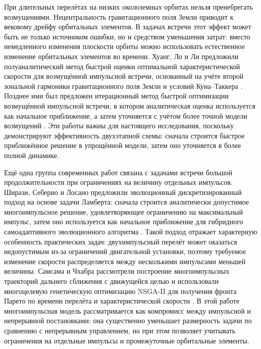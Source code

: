 При длительных перелётах на низких околоземных орбитах нельзя пренебрегать возмущениями. Нецентральность гравитационного поля Земли приводит к вековому дрейфу орбитальных элементов. В задачах встречи этот эффект может быть не только источником ошибки, но и средством уменьшения затрат: вместо немедленного изменения плоскости орбиты можно использовать естественное изменение орбитальных элементов во времени. Хуанг, Ло и Ли предложили полуаналитический метод быстрой оценки оптимальной характеристической скорости для возмущённой импульсной встречи, основанный на учёте второй зональной гармоники гравитационного поля Земли и условий Куна--Таккера \cite{huang2020fast}. Позднее ими был предложен итерационный метод быстрой оптимизации возмущённой импульсной встречи, в котором аналитическая оценка используется как начальное приближение, а затем уточняется с учётом более точной модели возмущений \cite{huang2021fast}. Эти работы важны для настоящего исследования, поскольку демонстрируют эффективность двухэтапной схемы: сначала строится быстрое приближённое решение в упрощённой модели, затем оно уточняется в более полной динамике.

Ещё одна группа современных работ связана с задачами встречи большой продолжительности при ограничениях на величину отдельных импульсов. Ширази, Себерио и Лосано предложили эволюционный дискретизированный подход на основе задачи Ламберта: сначала строится аналитически допустимое многоимпульсное решение, удовлетворяющее ограничению на максимальный импульс, затем оно используется как начальное приближение для гибридного самоадаптивного эволюционного алгоритма \cite{shirazi2019evolutionary}. Такой подход отражает характерную особенность практических задач: двухимпульсный перелёт может оказаться недопустимым из-за ограничений двигательной установки, поэтому требуемое изменение скорости распределяется между несколькими импульсами меньшей величины. Самсама и Чхабра рассмотрели построение многоимпульсных траекторий дальнего сближения с движущейся целью и использовали многоцелевую генетическую оптимизацию NSGA-II для получения фронта Парето по времени перелёта и характеристической скорости \cite{samsam2022multi}. В этой работе многоимпульсная модель рассматривается как компромисс между импульсной и непрерывной постановками: она существенно уменьшает размерность задачи по сравнению с непрерывным управлением, но при этом позволяет учитывать ограничения на отдельные импульсы и промежуточные орбитальные элементы.

